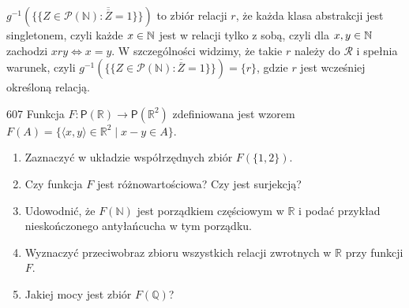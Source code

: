 \documentclass{../note}
\begin{document}
\begin{rozwiazanie}
\begin{enumerate}[label=(\alph*)]
    $g^{-1}(\{\{Z \in \mathcal{P}(\mathbb{N}) : \overline{\overline{Z}} = 1\}\})$ to zbiór relacji $r$, że każda klasa abstrakcji jest singletonem, czyli każde $x \in \mathbb{N}$ jest w relacji tylko z sobą, czyli dla $x, y \in \mathbb{N}$ zachodzi $xry \Leftrightarrow x = y$. W szczególności widzimy, że takie $r$ należy do $\mathcal{R}$ i spełnia warunek, czyli $g^{-1}(\{\{Z \in \mathcal{P}(\mathbb{N}) : \overline{\overline{Z}} = 1\}\}) = \{r\}$, gdzie $r$ jest wcześniej określoną relacją.\\

\end{enumerate}
\end{rozwiazanie}

\begin{zadanie}{607}
Funkcja $F:\mathsf{P}(\mathbb{R})\rightarrow \mathsf{P}(\mathbb{R}^{2})$ zdefiniowana jest wzorem $F(A)=\{\langle x,y\rangle\in\mathbb{R}^{2} \mid x-y\in A\}$.
\begin{enumerate}
    \item[(a)] Zaznaczyć w układzie współrzędnych zbiór $F(\{1,2\})$.
    \item[(b)] Czy funkcja $F$ jest różnowartościowa? Czy jest surjekcją?
    \item[(c)] Udowodnić, że $F(\mathbb{N})$ jest porządkiem częściowym w $\mathbb{R}$ i podać przykład nieskończonego antyłańcucha w tym porządku.
    \item[(d)] Wyznaczyć przeciwobraz zbioru wszystkich relacji zwrotnych w $\mathbb{R}$ przy funkcji $F$.
    \item[(e)] Jakiej mocy jest zbiór $F(\mathbb{Q})$?
\end{enumerate}
\end{zadanie}
\end{document}

